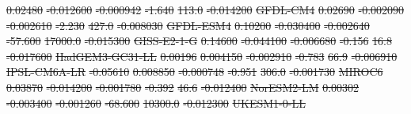 \documentclass[gmd, manuscript]{copernicus}
\providecommand{\DIFdel}[1]{{\protect\color{red}\sout{#1}}}                      %
\begin{document}
\DIFdel{0.02480 }%
\DIFdel{-0.012600 }%
\DIFdel{-0.000942 }%
\DIFdel{-1.640 }%
\DIFdel{113.0 }%
\DIFdel{-0.014200 }%
\DIFdel{GFDL-CM4        }%
\DIFdel{0.02690 }%
\DIFdel{-0.002090 }%
\DIFdel{-0.002610 }%
\DIFdel{-2.230 }%
\DIFdel{427.0 }%
\DIFdel{-0.008030 }%
\DIFdel{GFDL-ESM4       }%
\DIFdel{0.10200 }%
\DIFdel{-0.030400 }%
\DIFdel{-0.002640 }%
\DIFdel{-57.600 }%
\DIFdel{17000.0 }%
\DIFdel{-0.015300 }%
\DIFdel{GISS-E2-1-G     }%
\DIFdel{0.14600 }%
\DIFdel{-0.044100 }%
\DIFdel{-0.006680 }%
\DIFdel{-0.156 }%
\DIFdel{16.8 }%
\DIFdel{-0.017600 }%
\DIFdel{HadGEM3-GC31-LL }%
\DIFdel{0.00196 }%
\DIFdel{0.004150 }%
\DIFdel{-0.002910 }%
\DIFdel{-0.783 }%
\DIFdel{66.9 }%
\DIFdel{-0.006910 }%
\DIFdel{IPSL-CM6A-LR    }%
\DIFdel{-0.05610 }%
\DIFdel{0.008850 }%
\DIFdel{-0.000748 }%
\DIFdel{-0.951 }%
\DIFdel{306.0 }%
\DIFdel{-0.001730 }%
\DIFdel{MIROC6          }%
\DIFdel{0.03870 }%
\DIFdel{-0.014200 }%
\DIFdel{-0.001780 }%
\DIFdel{-0.392 }%
\DIFdel{46.6 }%
\DIFdel{-0.012400 }%
\DIFdel{NorESM2-LM      }%
\DIFdel{0.00302 }%
\DIFdel{-0.003400 }%
\DIFdel{-0.001260 }%
\DIFdel{-68.600 }%
\DIFdel{10300.0 }%
\DIFdel{-0.012300 }%
\DIFdel{UKESM1-0-LL     }%
\end{document}
